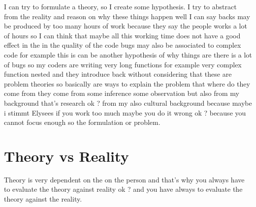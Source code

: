\documentclass[conference, compsoc, twoside]{IEEEtran}
\begin{document}

I can try to formulate a theory, so I create some hypothesis. 
I try to abstract from the reality and reason on why these things happen well I can say backs may be produced by too many hours of work because they say the people works a lot of hours 
so I can think that maybe all this working time does not have a good effect in the in the quality of the code bugs may also be associated to complex code 
for example this is can be another hypothesis of why things are there is a lot of bugs so my coders are writing very long functions 
for example very complex function nested and they introduce back without considering that these are problem theories so basically are ways to explain the problem that where do they come from they come from some inference some observation but also from my background that's research ok ? from my also cultural background because maybe i stimmt Elysees if you work too much maybe you do it wrong ok ? because you cannot focus enough so the formulation or problem.
\section{Theory vs Reality} %
\label{sec:theory_vs_reality}
Theory is very dependent on the on the person and that's why you always have to evaluate the theory against reality ok ? and you have always to evaluate the theory against the reality.
\end{document}
